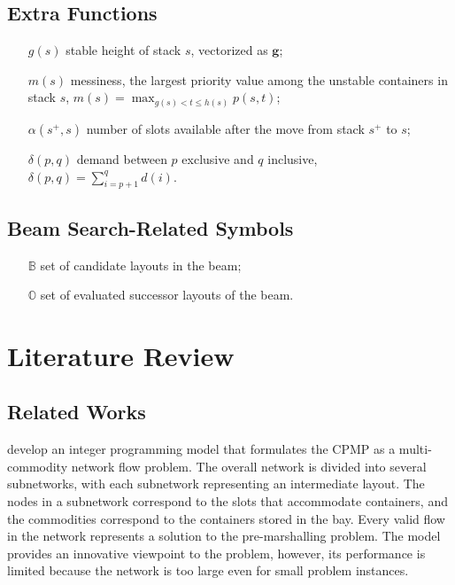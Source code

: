\documentclass{article}
\begin{document}
\subsection{Extra Functions}
\begin{enumerate}[noitemsep, align=LabelCenter,labelwidth=\cpmpmylongest,leftmargin=!]
\item[$g(s)$] stable height of stack $s$, vectorized as $\boldsymbol{ g}$;
\item[$m(s)$] messiness, the largest priority value among the unstable containers in stack $s$, $m(s)=\max_{ g(s)<t\le h(s)} p(s,t)$;
\item[$\alpha(s^+,s)$] number of slots available after the move from stack $s^+$ to $s$;
\item[$\delta(p,q)$] demand between $p$ exclusive and $q$ inclusive, $\delta(p,q)=\sum_{i=p+1}^{q}d(i)$.
\end{enumerate}

\subsection{Beam Search-Related Symbols}
\begin{enumerate}[noitemsep, align=LabelCenter,labelwidth=\cpmpmylongest,leftmargin=!]
\item[$\mathbb{B}$] set of candidate layouts in the beam;
\item[$\mathbb{O}$] set of evaluated successor layouts of the beam.
\end{enumerate}



\section{Literature Review}
\label{cpmp:sec:literature}

\subsection{Related Works}
\cite{Lee20073295} develop an integer programming model that formulates the CPMP as a multi-commodity network flow problem. The overall network is divided into several subnetworks, with each subnetwork representing an intermediate layout. The nodes in a subnetwork correspond to the slots that accommodate containers, and the commodities correspond to the containers stored in the bay. Every valid flow in the network represents a solution to the pre-marshalling problem. The model provides an innovative viewpoint to the problem, however, its performance is limited because the network is too large even for small problem instances.
\end{document}
